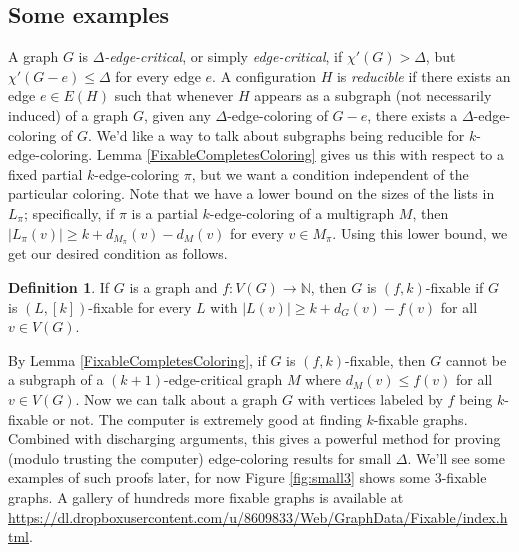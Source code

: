 \documentclass[12pt]{article}
\theoremstyle{plain}
\theoremstyle{definition}
\newtheorem{defn}{Definition}
\theoremstyle{remark}
\newcommand{\IN}{\mathbb{N}}
\newcommand{\func}[3]{#1\colon #2 \rightarrow #3}
\newcommand{\irange}[1]{\left[#1\right]}
\begin{document}
\subsection{Some examples}
A graph $G$ is \emph{$\Delta$-edge-critical}, or simply \emph{edge-critical},
if $\chi'(G)>\Delta$, but $\chi'(G-e)\le\Delta$ for every edge $e$.  A
configuration $H$ is \emph{reducible} if there exists an edge $e\in E(H)$ such
that whenever $H$ appears as a subgraph (not necessarily induced) of a graph
$G$, given any $\Delta$-edge-coloring of $G-e$, there exists a
$\Delta$-edge-coloring of $G$.
We'd like a way to talk about subgraphs being reducible for $k$-edge-coloring. 
Lemma \ref{FixableCompletesColoring} gives us this with respect to a fixed
partial $k$-edge-coloring $\pi$, but we want a condition independent of the
particular coloring.  Note that we have a lower bound on the sizes of the lists
in $L_\pi$; specifically, if $\pi$ is a partial $k$-edge-coloring of a
multigraph $M$, then $|L_{\pi}(v)| \ge k + d_{M_\pi}(v) - d_M(v)$ for every $v
\in M_{\pi}$. Using this lower bound, we get our desired condition as follows.

\begin{defn}
If $G$ is a graph and $\func{f}{V(G)}{\IN}$, then $G$ is $(f,k)$-fixable if $G$
is $(L, \irange{k})$-fixable for every $L$ with $|L(v)| \ge k + d_{G}(v) -
f(v)$ for all $v \in V(G)$.
\end{defn}

By Lemma \ref{FixableCompletesColoring}, if $G$ is $(f,k)$-fixable, then $G$
cannot be a subgraph of a $(k+1)$-edge-critical graph $M$ where $d_M(v) \le
f(v)$ for all $v \in V(G)$.  
Now we can talk about a graph $G$ with vertices labeled by $f$ being
$k$-fixable or not.  The computer is extremely good at finding $k$-fixable
graphs.  Combined with discharging arguments, this gives a powerful method for
proving (modulo trusting the computer) edge-coloring results for small
$\Delta$.  We'll see some examples of such proofs later, for now Figure
\ref{fig:small3} shows some $3$-fixable graphs.  A gallery of hundreds more
fixable graphs is available at
\url{https://dl.dropboxusercontent.com/u/8609833/Web/GraphData/Fixable/index.html}.
\end{document}
